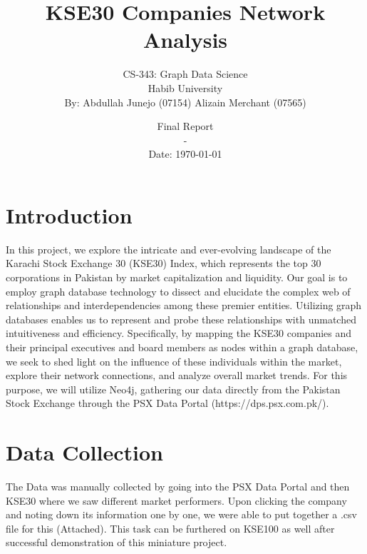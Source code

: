 \documentclass[12pt]{article}
\title{\textbf{KSE30 Companies Network Analysis}}
\author{CS-343: Graph Data Science \\Habib University \\By: Abdullah Junejo (07154)  Alizain Merchant (07565) }
\date{Final Report\\ - \\ Date: \today}
\begin{document}
\maketitle

\section{Introduction}
In this project, we explore the intricate and ever-evolving landscape of the Karachi Stock Exchange 30 (KSE30) Index, which represents the top 30 corporations in Pakistan by market capitalization and liquidity. Our goal is to employ graph database technology to dissect and elucidate the complex web of relationships and interdependencies among these premier entities. Utilizing graph databases enables us to represent and probe these relationships with unmatched intuitiveness and efficiency. Specifically, by mapping the KSE30 companies and their principal executives and board members as nodes within a graph database, we seek to shed light on the influence of these individuals within the market, explore their network connections, and analyze overall market trends. For this purpose, we will utilize Neo4j, gathering our data directly from the Pakistan Stock Exchange through the PSX Data Portal (https://dps.psx.com.pk/).
\section{Data Collection}
The Data was manually collected by going into the PSX Data Portal and then KSE30 where we saw different market performers. Upon clicking the company and noting down its information one by one, we were able to put together a .csv file for this (Attached). This task can be furthered on KSE100 as well after successful demonstration of this miniature project.
\end{document}

